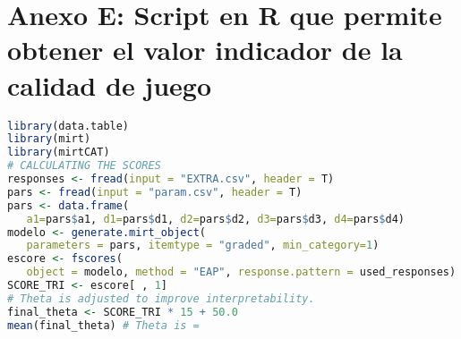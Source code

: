 \chapter*{Anexo E: Script en R que permite obtener el valor indicador de la calidad de juego}\label{AnexoE}



\begin{lstlisting}[language=R, caption=Script en R para evaluar el videojuego]
library(data.table)
library(mirt)
library(mirtCAT)
# CALCULATING THE SCORES
responses <- fread(input = "EXTRA.csv", header = T)
pars <- fread(input = "param.csv", header = T)
pars <- data.frame(
   a1=pars$a1, d1=pars$d1, d2=pars$d2, d3=pars$d3, d4=pars$d4)
modelo <- generate.mirt_object(
   parameters = pars, itemtype = "graded", min_category=1)
escore <- fscores(
   object = modelo, method = "EAP", response.pattern = used_responses)
SCORE_TRI <- escore[ , 1]
# Theta is adjusted to improve interpretability.
final_theta <- SCORE_TRI * 15 + 50.0
mean(final_theta) # Theta is =
\end{lstlisting}

\restoregeometry
